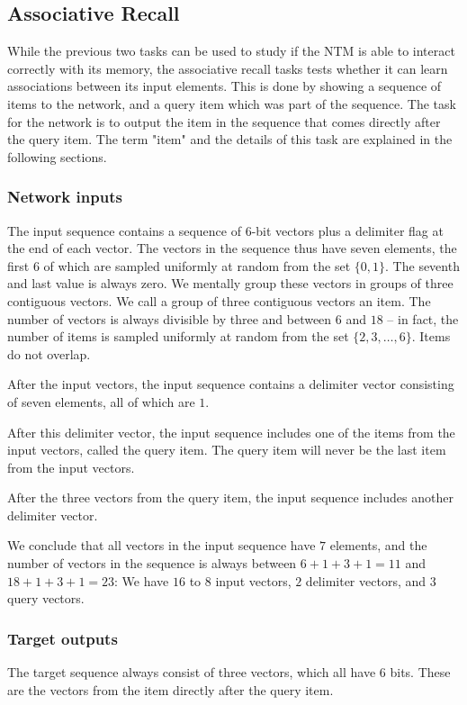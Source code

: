 \documentclass[12pt,twoside]{article}
\theoremstyle{plain}
\theoremstyle{definition}
\theoremstyle{remark}
\begin{document}
\subsection{Associative Recall}
While the previous two tasks can be used to study if the NTM is able to interact correctly with its memory, the associative recall tasks tests whether it can learn associations between its input elements. This is done by showing a sequence of items to the network, and a query item which was part of the sequence. The task for the network is to output the item in the sequence that comes directly after the query item. The term "item" and the details of this task are explained in the following sections.

\subsubsection{Network inputs}
The input sequence contains a sequence of 6-bit vectors plus a delimiter flag at the end of each vector. The vectors in the sequence thus have seven elements, the first $6$ of which are sampled uniformly at random from the set $\{0, 1\}$. The seventh and last value is always zero. We mentally group these vectors in groups of three contiguous vectors. We call a group of three contiguous vectors an item. The number of vectors is always divisible by three and between $6$ and $18$ -- in fact, the number of items is sampled uniformly at random from the set $\{2, 3, \ldots, 6\}$. Items do not overlap.

After the input vectors, the input sequence contains a delimiter vector consisting of seven elements, all of which are $1$.

After this delimiter vector, the input sequence includes one of the items from the input vectors, called the query item. The query item will never be the last item from the input vectors.

After the three vectors from the query item, the input sequence includes another delimiter vector.

We conclude that all vectors in the input sequence have $7$ elements, and the number of vectors in the sequence is always between $6 + 1 + 3 + 1 = 11$ and $18 + 1 + 3 + 1 = 23$: We have $16$ to $8$ input vectors, $2$ delimiter vectors, and $3$ query vectors.

\subsubsection{Target outputs}
The target sequence always consist of three vectors, which all have $6$ bits. These are the vectors from the item directly after the query item.
\end{document}
